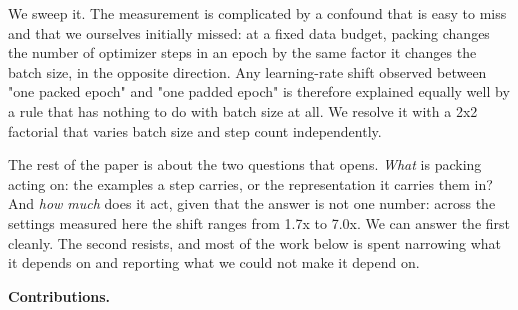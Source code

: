 \documentclass[11pt]{article}
\begin{document}
We sweep it. The measurement is complicated by a confound that is easy to miss and that we ourselves initially missed: at a fixed data budget, packing changes the number of optimizer steps in an epoch by the same factor it changes the batch size, in the opposite direction. Any learning-rate shift observed between "one packed epoch" and "one padded epoch" is therefore explained equally well by a rule that has nothing to do with batch size at all. We resolve it with a 2x2 factorial that varies batch size and step count independently.

The rest of the paper is about the two questions that opens. \emph{What} is packing acting on: the examples a step carries, or the representation it carries them in? And \emph{how much} does it act, given that the answer is not one number: across the settings measured here the shift ranges from 1.7x to 7.0x. We can answer the first cleanly. The second resists, and most of the work below is spent narrowing what it depends on and reporting what we could not make it depend on.

\textbf{Contributions.}
\end{document}
